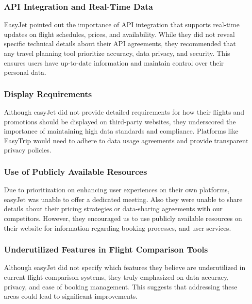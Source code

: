 \subsubsection{API Integration and Real-Time Data}
EasyJet pointed out the importance of API integration that supports real-time updates on flight schedules, prices, and availability. While they did not reveal specific technical details about their API agreements, they recommended that any travel planning tool prioritize accuracy, data privacy, and security. This ensures users have up-to-date information and maintain control over their personal data.

\subsubsection{Display Requirements}
Although easyJet did not provide detailed requirements for how their flights and promotions should be displayed on third-party websites, they underscored the importance of maintaining high data standards and compliance. Platforms like EasyTrip would need to adhere to data usage agreements and provide transparent privacy policies.

\subsubsection{Use of Publicly Available Resources}
Due to prioritization on enhancing user experiences on their own platforms, easyJet was unable to offer a dedicated meeting. Also they were unable to share details about their pricing strategies or data-sharing agreements with our competitors. However, they encouraged us to use publicly available resources on their website for information regarding booking processes, and user services.

\subsubsection{Underutilized Features in Flight Comparison Tools}
Although easyJet did not specify which features they believe are underutilized in current flight comparison systems, they truly emphasized on data accuracy, privacy, and ease of booking management. This suggests that addressing these areas could lead to significant improvements.

